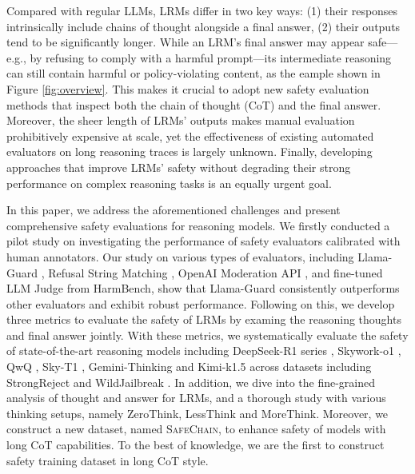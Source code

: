 Compared with regular LLMs, LRMs differ in two key ways: (1) their responses intrinsically include chains of thought alongside a final answer, (2) their outputs tend to be significantly longer. While an LRM’s final answer may appear safe—e.g., by refusing to comply with a harmful prompt—its intermediate reasoning can still contain harmful or policy-violating content, as the eample shown in Figure \ref{fig:overview}. This makes it crucial to adopt new safety evaluation methods that inspect both the chain of thought (CoT) and the final answer. Moreover, the sheer length of LRMs’ outputs makes manual evaluation prohibitively expensive at scale, yet the effectiveness of existing automated evaluators on long reasoning traces is largely unknown. Finally, developing approaches that improve LRMs’ safety without degrading their strong performance on complex reasoning tasks is an equally urgent goal.

In this paper, we address the aforementioned challenges and present comprehensive safety evaluations for reasoning models. 
We firstly conducted a pilot study on investigating the performance of safety evaluators calibrated with human annotators. Our study on various types of evaluators, including Llama-Guard \citep{inan2023llama}, Refusal String Matching \citep{zou2023universal}, OpenAI Moderation API \citep{openai2024moduration}, and fine-tuned LLM Judge from HarmBench\citep{pmlr-v235-mazeika24a}, show that Llama-Guard consistently outperforms other evaluators and exhibit robust performance. Following on this, we develop three metrics to evaluate the safety of LRMs by examing the reasoning thoughts and final answer jointly. With these metrics, we systematically evaluate the safety of state-of-the-art reasoning models including DeepSeek-R1 series \citep{guo2025deepseek}, Skywork-o1 \citep{skyworkopeno12024}, QwQ \citep{qwq-32b-preview}, Sky-T1 \citep{reduce_overthinking_2025} , Gemini-Thinking \cite{deepmind_gemini} and Kimi-k1.5 \citep{team2025kimi} across datasets including StrongReject \citep{souly2024strongreject} and WildJailbreak \citep{jiang2024wildteaming}. In addition, we dive into the fine-grained analysis of thought and answer for LRMs, and a thorough study with various thinking setups, namely ZeroThink, LessThink and MoreThink. Moreover, we construct a new dataset, named \textsc{SafeChain}, to enhance safety of models with long CoT capabilities. To the best of knowledge, we are the first to construct safety training dataset in long CoT style.
